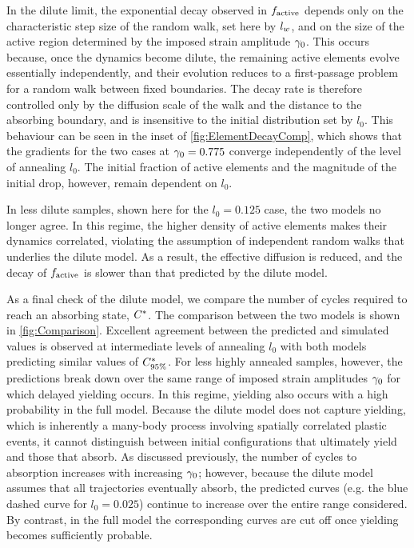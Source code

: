In the dilute limit, the exponential decay observed in $f_{\mathrm{active}}$ depends only on the characteristic step size of the random walk, set here by $l_w$, and on the size of the active region determined by the imposed strain amplitude $\gamma_0$. This occurs because, once the dynamics become dilute, the remaining active elements evolve essentially independently, and their evolution reduces to a first-passage problem for a random walk between fixed boundaries. The decay rate is therefore controlled only by the diffusion scale of the walk and the distance to the absorbing boundary, and is insensitive to the initial distribution set by $l_0$. This behaviour can be seen in the inset of \cref{fig:ElementDecayComp}, which shows that the gradients for the two cases at $\gamma_0 = 0.775$ converge independently of the level of annealing $l_0$. The initial fraction of active elements and the magnitude of the initial drop, however, remain dependent on $l_0$. 

In less dilute samples, shown here for the $l_0 = 0.125$ case, the two models no longer agree. In this regime, the higher density of active elements makes their dynamics correlated, violating the assumption of independent random walks that underlies the dilute model. As a result, the effective diffusion is reduced, and the decay of $f_{\mathrm{active}}$ is slower than that predicted by the dilute model.

As a final check of the dilute model, we compare the number of cycles required to reach an absorbing state, $C^\ast$. The comparison between the two models is shown in \cref{fig:Comparison}. Excellent agreement between the predicted and simulated values is observed at intermediate levels of annealing $l_0$ with both models predicting similar values of $C^\ast_{95\%}$. For less highly annealed samples, however, the predictions break down over the same range of imposed strain amplitudes 
$\gamma_0$ for which delayed yielding occurs. In this regime, yielding also occurs with a high probability in the full model. Because the dilute model does not capture yielding, which is inherently a many-body process involving spatially correlated plastic events, it cannot distinguish between initial configurations that ultimately yield and those that absorb. As discussed previously, the number of cycles to absorption increases with increasing $\gamma_0$; however, because the dilute model assumes that all trajectories eventually absorb, the predicted curves (e.g. the blue dashed curve for $l_0=0.025$) continue to increase over the entire range considered. By contrast, in the full model the corresponding curves are cut off once yielding becomes sufficiently probable.

